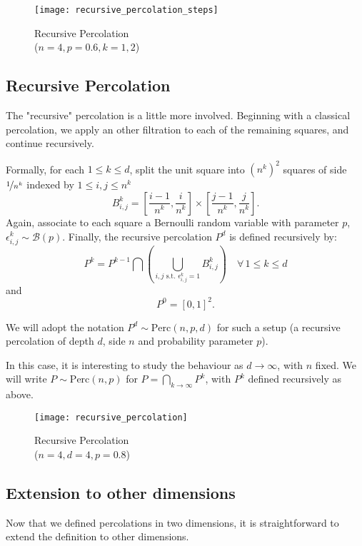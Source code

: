 \begin{wrapfigure}{r}{7.5cm}
	\vspace{-1.2cm}
	\centering
	\texttt{[image: recursive\_percolation\_steps]}
	\caption{Recursive Percolation\\($n=4, p=0.6, k=1,2$)}
	\label{fig:recursivePercolationSteps}
\end{wrapfigure}
\subsection{Recursive Percolation}
The "recursive" percolation is a little more involved.
Beginning with a classical percolation, we apply an other filtration to each of the remaining squares, and continue recursively.

Formally, for each $1 \leq k \leq d$, split the unit square into $\left( n^k \right)^2$ squares of side $\nicefrac{1}{n^k}$ indexed by $1 \leq i,j \leq n^k$
$$B_{i,j}^k = \left[ \frac{i-1}{n^k},\frac{i}{n^k} \right] \times \left[ \frac{j-1}{n^k},\frac{j}{n^k} \right].$$
Again, associate to each square a Bernoulli random variable with parameter $p$, $\epsilon_{i,j}^k \sim \mathcal{B}(p)$.
Finally, the recursive percolation $P^d$ is defined recursively by:
$$P^k = P^{k-1} \bigcap \left( \bigcup_{i,j \text{ s.t. } \epsilon_{i,j}^k = 1} B_{i,j}^k \right) \quad \forall \, 1 \leq k \leq d$$
and $$P^0 = \left[ 0,1 \right]^2.$$

We will adopt the notation $P^d \sim \text{Perc}(n,p,d)$ for such a setup (a recursive percolation of depth $d$, side $n$ and probability parameter $p$).

In this case, it is interesting to study the behaviour as $d \to \infty$, with $n$ fixed.
We will write $P \sim \text{Perc}(n,p)$ for $P = \bigcap_{k \to \infty} P^k$, with $P^k$ defined recursively as above.

\begin{figure}[!h]
	\centering
	\texttt{[image: recursive\_percolation]}
	\caption{Recursive Percolation\\($n=4, d=4, p=0.8$)}
	\label{fig:recursivePercolation}
\end{figure}

\subsection{Extension to other dimensions}
Now that we defined percolations in two dimensions, it is straightforward to extend the definition to other dimensions.

